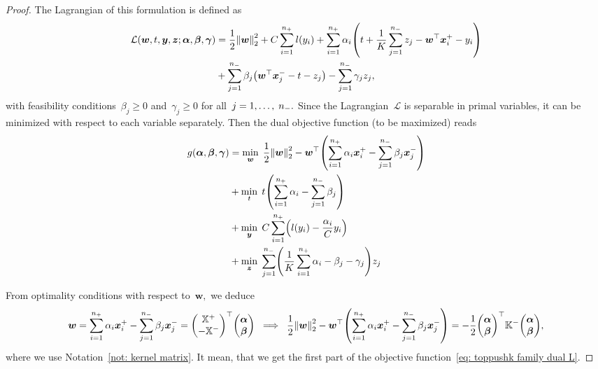 \begin{proof}
  The Lagrangian of this formulation is defined as 
  \begin{align*}
    \mathcal{L}(\bm{w}, t, \bm{y}, \bm{z}; \bm{\alpha}, \bm{\beta}, \bm{\gamma})
     & = \frac{1}{2} \norm{\bm{w}}_{2}^{2}
       + C \sum_{i = 1}^{\npos} l(y_i)
       + \sum_{i = 1}^{\npos} \alpha_i \Brac{t + \frac{1}{K} \sum_{j = 1}^{\nneg} z_j - \bm{w}^{\top} \bm{x}^+_i - y_i} \\
     & + \sum_{j = 1}^{\nneg} \beta_j \Brac{\bm{w}^{\top} \bm{x}^-_j - t - z_j}
       - \sum_{j = 1}^{\nneg} \gamma_j z_j,
  \end{align*}
  with feasibility conditions~$\beta_j \geq 0$ and~$\gamma_j \geq 0$ for all~$j = 1, \ldots, \; n_{-}.$ Since the Lagrangian~$\mathcal{L}$ is separable in primal variables, it can be minimized with respect to each variable separately. Then the dual objective function (to be maximized) reads
  \begin{subequations}\label{eq: TopPushK dual function}
    \begin{align}
      g(\bm{\alpha}, \bm{\beta}, \bm{\gamma})
        & = \min_{\bm{w}} \; \frac{1}{2} \norm{\bm{w}}_{2}^{2}
          - \bm{w}^{\top} \Brac{\sum_{i = 1}^{\npos} \alpha_i \bm{x}^+_i - \sum_{j = 1}^{\nneg} \beta_j \bm{x}^-_j} \label{eq: TopPushK dual function w}\\
        & + \min_{t} \; t \Brac{\sum_{i = 1}^{\npos} \alpha_i - \sum_{j = 1}^{\nneg} \beta_j} \label{eq: TopPushK dual function t}\\
        & + \min_{\bm{y}} \; C \sum_{i = 1}^{\npos} \Brac{l(y_i) - \frac{\alpha_i}{C}y_i} \label{eq: TopPushK dual function y}\\
        & + \min_{\bm{z}} \; \sum_{j = 1}^{\nneg} \Brac{\frac{1}{K} \sum_{i = 1}^{\npos} \alpha_i - \beta_j - \gamma_j}z_j \label{eq: TopPushK dual function z}
    \end{align}
  \end{subequations}
  
  From optimality conditions with respect to~$\bm{w},$ we deduce 
  \begin{equation*}
    \bm{w}
      = \sum_{i = 1}^{\npos} \alpha_i \bm{x}^+_i - \sum_{j = 1}^{\nneg} \beta_j \bm{x}^-_j
      = \Matrix{\X^+ \\ - \X^-}^\top \vecab
    \; \implies \;
    \frac{1}{2} \norm{\bm{w}}_{2}^{2} - \bm{w}^{\top} \Brac{\sum_{i = 1}^{\npos} \alpha_i \bm{x}^+_i - \sum_{j = 1}^{\nneg} \beta_j \bm{x}^-_j}
      = - \frac{1}{2} \vecab^{\top} \Kneg \vecab,
  \end{equation*}
  where we use Notation~\ref{not: kernel matrix}. It mean, that we get the first part of the objective function~\eqref{eq: toppushk family dual L}.
  

\end{proof}
